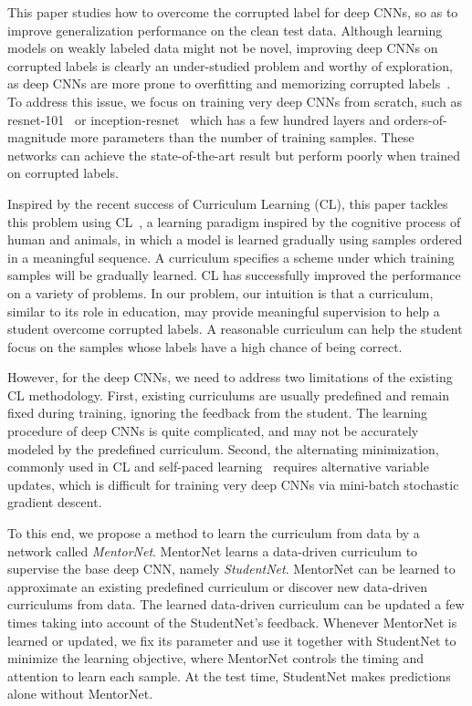 \documentclass{article}
\begin{document}
This paper studies how to overcome the corrupted label for deep CNNs, so as to improve generalization performance on the clean test data. Although learning models on weakly labeled data might not be novel, improving deep CNNs on corrupted labels is clearly an under-studied problem and worthy of exploration, as deep CNNs are more prone to overfitting and memorizing corrupted labels~\cite{zhang2017understanding}. To address this issue, we focus on training very deep CNNs from scratch, such as resnet-101~\cite{he2016deep} or inception-resnet~\cite{szegedy2017inception} which has a few hundred layers and orders-of-magnitude more parameters than the number of training samples. These networks can achieve the state-of-the-art result but perform poorly when trained on corrupted labels.

Inspired by the recent success of Curriculum Learning (CL), this paper tackles this problem using CL~\cite{bengio2009curriculum}, a learning paradigm inspired by the cognitive process of human and animals, in which a model is learned gradually using samples ordered in a meaningful sequence. A curriculum specifies a scheme under which training samples will be gradually learned. CL has successfully improved the performance on a variety of problems. In our problem, our intuition is that a curriculum, similar to its role in education, may provide meaningful supervision to help a student overcome corrupted labels. A reasonable curriculum can help the student focus on the samples whose labels have a high chance of being correct.

However, for the deep CNNs, we need to address two limitations of the existing CL methodology. First, existing curriculums are usually predefined and remain fixed during training, ignoring the feedback from the student. The learning procedure of deep CNNs is quite complicated, and may not be accurately modeled by the predefined curriculum. Second, the alternating minimization, commonly used in CL and self-paced learning~\cite{kumar2010self} requires alternative variable updates, which is difficult for training very deep CNNs via mini-batch stochastic gradient descent.

To this end, we propose a method to learn the curriculum from data by a network called \emph{MentorNet}. MentorNet learns a data-driven curriculum to supervise the base deep CNN, namely \emph{StudentNet}. MentorNet can be learned to approximate an existing predefined curriculum or discover new data-driven curriculums from data. The learned data-driven curriculum can be updated a few times taking into account of the StudentNet's feedback. Whenever MentorNet is learned or updated, we fix its parameter and use it together with StudentNet to minimize the learning objective, where MentorNet controls the timing and attention to learn each sample. At the test time, StudentNet makes predictions alone without MentorNet.
\end{document}
